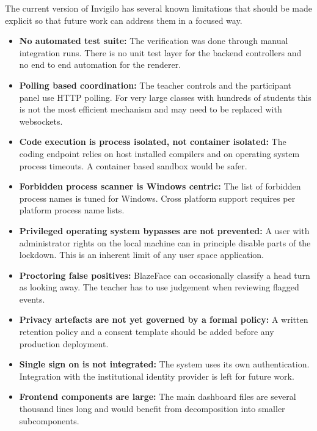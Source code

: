 \documentclass[12pt, a4paper]{report}
\begin{document}
\begin{justify}
  {\fontsize{12}{18}\selectfont
    The current version of Invigilo has several known limitations that should be made explicit so that future work can address them in a focused way.

    \begin{itemize}
        \item \textbf{No automated test suite:} The verification was done through manual integration runs. There is no unit test layer for the backend controllers and no end to end automation for the renderer.
        \item \textbf{Polling based coordination:} The teacher controls and the participant panel use HTTP polling. For very large classes with hundreds of students this is not the most efficient mechanism and may need to be replaced with websockets.
        \item \textbf{Code execution is process isolated, not container isolated:} The coding endpoint relies on host installed compilers and on operating system process timeouts. A container based sandbox would be safer.
        \item \textbf{Forbidden process scanner is Windows centric:} The list of forbidden process names is tuned for Windows. Cross platform support requires per platform process name lists.
        \item \textbf{Privileged operating system bypasses are not prevented:} A user with administrator rights on the local machine can in principle disable parts of the lockdown. This is an inherent limit of any user space application.
        \item \textbf{Proctoring false positives:} BlazeFace can occasionally classify a head turn as looking away. The teacher has to use judgement when reviewing flagged events.
        \item \textbf{Privacy artefacts are not yet governed by a formal policy:} A written retention policy and a consent template should be added before any production deployment.
        \item \textbf{Single sign on is not integrated:} The system uses its own authentication. Integration with the institutional identity provider is left for future work.
        \item \textbf{Frontend components are large:} The main dashboard files are several thousand lines long and would benefit from decomposition into smaller subcomponents.
    \end{itemize}
  }
\end{justify}
\end{document}
